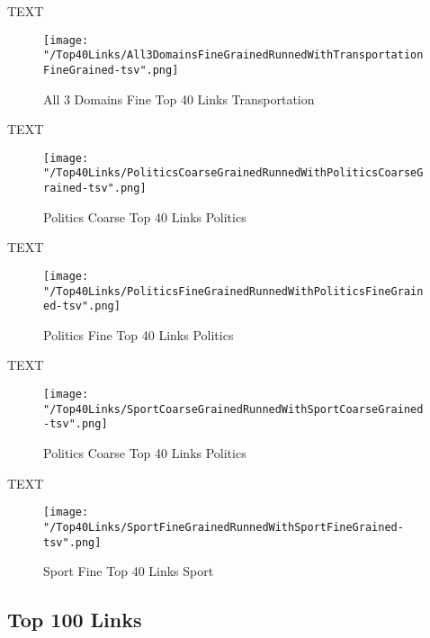 \documentclass[thesis=M,english]{FITthesis}[2018/05/30]
\begin{document}
		TEXT	

	\begin{figure}[H]\centering
		\texttt{[image: "/Top40Links/All3DomainsFineGrainedRunnedWithTransportationFineGrained-tsv".png]}
		\caption{All 3 Domains Fine Top 40 Links Transportation}\label{}	
	\end{figure}
	
	TEXT

	\begin{figure}[H]\centering
		\texttt{[image: "/Top40Links/PoliticsCoarseGrainedRunnedWithPoliticsCoarseGrained-tsv".png]}
		\caption{Politics Coarse Top 40 Links Politics}\label{}
	\end{figure}	

	TEXT	

	\begin{figure}[H]\centering
		\texttt{[image: "/Top40Links/PoliticsFineGrainedRunnedWithPoliticsFineGrained-tsv".png]}
		\caption{Politics Fine Top 40 Links Politics}\label{}
	\end{figure}

	
	TEXT

	\begin{figure}[H]\centering
		\texttt{[image: "/Top40Links/SportCoarseGrainedRunnedWithSportCoarseGrained-tsv".png]}
		\caption{Politics Coarse Top 40 Links Politics}\label{}
	\end{figure}		
	
		TEXT	

	\begin{figure}[H]\centering
		\texttt{[image: "/Top40Links/SportFineGrainedRunnedWithSportFineGrained-tsv".png]}
		\caption{Sport Fine Top 40 Links Sport}\label{}	
	\end{figure}	

\subsection{Top 100 Links}
\end{document}
